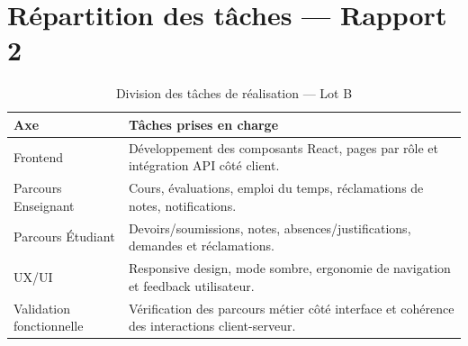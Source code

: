 \section{Répartition des tâches — Rapport 2}

\begin{table}[H]
\centering
\caption{Division des tâches de réalisation — Lot B}
\label{tab:taches_realisation_lot_b}
\begin{tabularx}{\textwidth}{lX}
\toprule
\textbf{Axe} & \textbf{Tâches prises en charge} \\
\midrule
Frontend & Développement des composants React, pages par rôle et intégration API côté client. \\
Parcours Enseignant & Cours, évaluations, emploi du temps, réclamations de notes, notifications. \\
Parcours Étudiant & Devoirs/soumissions, notes, absences/justifications, demandes et réclamations. \\
UX/UI & Responsive design, mode sombre, ergonomie de navigation et feedback utilisateur. \\
Validation fonctionnelle & Vérification des parcours métier côté interface et cohérence des interactions client-serveur. \\
\bottomrule
\end{tabularx}
\end{table}

\newpage
